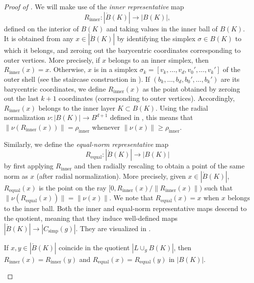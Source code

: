 \documentclass[a4paper,english,cleveref,autoref,thm-restate,nolineno]{socg-lipics-v2021}
\newcommand{\geomreal}[1] { |#1| } %
\newcommand{\conesimp}[1] { C_\mathrm{simp}(#1) } %
\begin{document}
\begin{proof}[Proof of ]
	We will make use of the \textit{inner representative} map 
	\[
	R_{\mathrm{inner}} \colon \geomreal{\mathring{B}(K)}\to \geomreal{B(K)},
	\]
	defined on the interior of $B(K)$ and taking values in the inner ball of $B(K)$.
	It is obtained from any $x\in\geomreal{\mathring{B}(K)}$ by identifying the simplex $\sigma\in B(K)$ to which it belongs, and zeroing out the barycentric coordinates corresponding to outer vertices.
	More precisely, if $x$ belongs to an inner simplex, then $R_{\mathrm{inner}}(x)=x$.
	Otherwise, $x$ is in a simplex $\sigma_k=[v_k,\dots,v_d,v_0',\dots,v_k']$ of the outer shell (see the staircase construction in ).
	If $(b_k,\dots,b_d,b_0',\dots,b_k')$ are its barycentric coordinates, we define $R_{\mathrm{inner}}(x)$ as the point obtained by zeroing out the last $k+1$ coordinates (corresponding to outer vertices). Accordingly, $R_{\mathrm{inner}}(x)$ belongs to the inner layer $K\subset B(K)$.
	Using the radial normalization $\nu\colon\geomreal{B(K)}\to  B^{d+1}$ defined in , this means that $\|\nu(R_{\mathrm{inner}}(x))\| = \rho_{\mathrm{inner}}$ whenever $\|\nu(x)\|\geq \rho_{\mathrm{inner}}$.
	
	Similarly, we define the \textit{equal-norm representative} map 
	\[
	R_{\mathrm{equal}} \colon \geomreal{\mathring{B}(K)}\to \geomreal{B(K)}
	\]
	by first applying $R_{\mathrm{inner}}$ and then radially rescaling to obtain a point of the same norm as $x$ (after radial normalization).
	More precisely, given $x\in\geomreal{\mathring{B}(K)}$, $R_{\mathrm{equal}}(x)$ is the point on the ray $[0, R_{\mathrm{inner}}(x)/\|R_{\mathrm{inner}}(x)\|)$ such that $\|\nu(R_{\mathrm{equal}}(x))\| = \|\nu(x)\|$.
	We note that $R_{\mathrm{equal}}(x)=x$ when $x$ belongs to the inner ball.
	Both the inner and equal-norm representative maps descend to the quotient, meaning that they induce well-defined maps $\geomreal{\mathring{B}(K)}\to\geomreal{\conesimp{g}}$.
	They are visualized in .
		
	\begin{claim}\label{claim:representatives}
		If $x,y\in\geomreal{\mathring{B}(K)}$ coincide in the quotient $\geomreal{L\cup_g B(K)}$, then $R_{\mathrm{inner}}(x)=R_{\mathrm{inner}}(y)$ and $R_{\mathrm{equal}}(x)=R_{\mathrm{equal}}(y)$ in $\geomreal{B(K)}$.
	\end{claim}
	

\end{proof}
\end{document}
